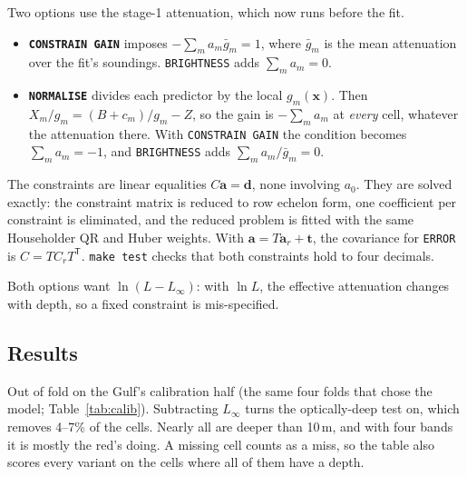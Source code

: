 \documentclass[11pt]{article}
\numberwithin{equation}{section}
\newcommand{\bx}{\mathbf{x}}
\newcommand{\code}[1]{\texttt{#1}}
\begin{document}
Two options use the stage-1 attenuation, which now runs before the fit.
\begin{itemize}
\item \textbf{\code{CONSTRAIN GAIN}} imposes $-\sum_m a_m \bar g_m = 1$, where $\bar g_m$ is the
  mean attenuation over the fit's soundings. \code{BRIGHTNESS} adds $\sum_m a_m = 0$.
\item \textbf{\code{NORMALISE}} divides each predictor by the local $g_m(\bx)$. Then
  $X_m/g_m = (B + c_m)/g_m - Z$, so the gain is $-\sum_m a_m$ at \emph{every} cell, whatever the
  attenuation there. With \code{CONSTRAIN GAIN} the condition becomes $\sum_m a_m = -1$, and
  \code{BRIGHTNESS} adds $\sum_m a_m/\bar g_m = 0$.
\end{itemize}
The constraints are linear equalities $C\mathbf{a} = \mathbf{d}$, none involving $a_0$. They are
solved exactly: the constraint matrix is reduced to row echelon form, one coefficient per
constraint is eliminated, and the reduced problem is fitted with the same Householder QR and
Huber weights. With $\mathbf{a} = T\mathbf{a}_r + \mathbf{t}$, the covariance for \code{ERROR} is
$C = T C_r T^{\mathsf T}$. \code{make test} checks that both constraints hold to four decimals.

Both options want $\ln(L - L_{\infty})$: with $\ln L$, the effective attenuation changes with depth,
so a fixed constraint is mis-specified.

\subsection{Results}

Out of fold on the Gulf's calibration half (the same four folds that chose the model;
Table~\ref{tab:calib}). Subtracting $L_{\infty}$ turns the optically-deep test on, which removes
4--7\% of the cells. Nearly all are deeper than 10\,m, and with four bands it is mostly the red's
doing. A missing cell counts as a miss, so the table also scores every variant on the cells where
all of them have a depth.
\end{document}
